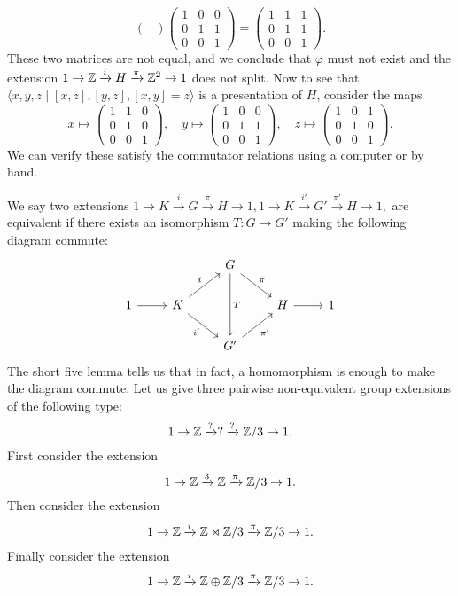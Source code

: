 \begin{ex}
\[\begin{pmatrix}
    \end{pmatrix}
    \begin{pmatrix}
        1 & 0 & 0 \\ 0 & 1 & 1 \\ 0 & 0 & 1
    \end{pmatrix}=
    \begin{pmatrix}
        1 & 1 & 1 \\ 0 & 1 & 1 \\ 0 & 0 & 1 
    \end{pmatrix}.
    \] These two matrices are not equal, and we conclude that $\varphi $ must not exist and the extension $1 \to  \mathbb{Z} \xrightarrow iH \xrightarrow{\pi} \mathbb{Z}^2 \to 1$ does not split.
    Now to see that $\langle x,y,z \mid [x,z],[y,z],[x,y]=z \rangle $ is a presentation of $H$, consider the maps \[
    x \mapsto 
    \begin{pmatrix}
        1 & 1 & 0 \\ 0 & 1 & 0 \\ 0 & 0 & 1 
    \end{pmatrix},\quad
    y \mapsto 
    \begin{pmatrix}
        1 & 0 & 0 \\ 0 & 1 & 1 \\ 0 & 0 & 1 
    \end{pmatrix},\quad
    z \mapsto 
    \begin{pmatrix}
        1 & 0 & 1 \\ 0 & 1 & 0 \\ 0 & 0 & 1 
    \end{pmatrix}.
    \] We can verify these satisfy the commutator relations using a computer or by hand.
\end{ex}
\begin{ex}
    We say two extensions $1 \to K \xrightarrow iG \xrightarrow{\pi} H \to 1,1 \to K \xrightarrow{i'} G' \xrightarrow{\pi'} H \to 1,$ are equivalent if there exists an isomorphism $T \colon G \to G'$ making the following diagram commute:
\[
\begin{tikzcd}
            &                                     & G \arrow[rd, "\pi"] \arrow[dd, "T"] &             &   \\
1 \arrow[r] & K \arrow[ru, "i"] \arrow[rd, "i'"'] &                                     & H \arrow[r] & 1 \\
            &                                     & G' \arrow[ru, "\pi'"']              &             &  
\end{tikzcd}
\] 
    The short five lemma tells us that in fact, a homomorphism is enough to make the diagram commute. Let us give three pairwise non-equivalent group extensions of the following type: \[
    1 \to  \mathbb{Z} \xrightarrow?  ? \xrightarrow? \mathbb{Z}/3 \to 1.
\] First consider the extension \[
1 \to  \mathbb{Z} \xrightarrow 3 \mathbb{Z} \xrightarrow{\pi} \mathbb{Z} /3 \to 1.
\] Then consider the extension \[
1 \to \mathbb{Z} \xrightarrow i \mathbb{Z} \rtimes \mathbb{Z} /3 \xrightarrow{\pi} \mathbb{Z} /3 \to 1.
\] Finally consider the extension \[
1 \to \mathbb{Z} \xrightarrow i \mathbb{Z} \oplus \mathbb{Z} /3 \xrightarrow{\pi} \mathbb{Z} /3 \to 1.
\] 
\end{ex}
